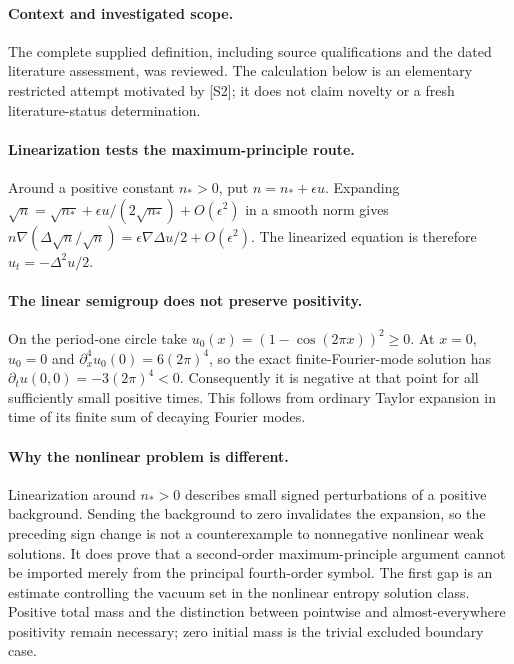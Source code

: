 \documentclass[11pt]{article}
\begin{document}
\paragraph{Context and investigated scope.} The complete supplied definition, including source qualifications and the dated literature assessment, was reviewed. The calculation below is an elementary restricted attempt motivated by [S2]; it does not claim novelty or a fresh literature-status determination.

\paragraph{Linearization tests the maximum-principle route.} Around a positive constant $n_*>0$, put $n=n_*+\epsilon u$. Expanding $\sqrt n=\sqrt{n_*}+\epsilon u/(2\sqrt{n_*})+O(\epsilon^2)$ in a smooth norm gives $n\nabla(\Delta\sqrt n/\sqrt n)=\epsilon\nabla\Delta u/2+O(\epsilon^2)$. The linearized equation is therefore $u_t=-\Delta^2u/2$.

\paragraph{The linear semigroup does not preserve positivity.} On the period-one circle take $u_0(x)=(1-\cos(2\pi x))^2\geq0$. At $x=0$, $u_0=0$ and $\partial_x^4u_0(0)=6(2\pi)^4$, so the exact finite-Fourier-mode solution has $\partial_tu(0,0)=-3(2\pi)^4<0$. Consequently it is negative at that point for all sufficiently small positive times. This follows from ordinary Taylor expansion in time of its finite sum of decaying Fourier modes.

\paragraph{Why the nonlinear problem is different.} Linearization around $n_*>0$ describes small signed perturbations of a positive background. Sending the background to zero invalidates the expansion, so the preceding sign change is not a counterexample to nonnegative nonlinear weak solutions. It does prove that a second-order maximum-principle argument cannot be imported merely from the principal fourth-order symbol. The first gap is an estimate controlling the vacuum set in the nonlinear entropy solution class. Positive total mass and the distinction between pointwise and almost-everywhere positivity remain necessary; zero initial mass is the trivial excluded boundary case.
\end{document}
